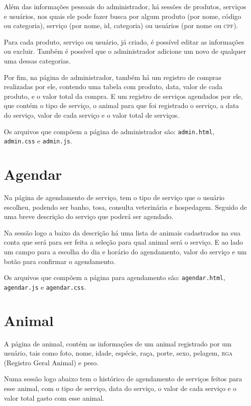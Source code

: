 Além das informações pessoais do administrador, há sessões de produtos,
serviços e usuários, nos quais ele pode fazer busca por algum produto (por nome,
código ou categoria), serviço (por nome, id, categoria) ou usuários (por nome ou
\textsc{cpf}).

Para cada produto, serviço ou usuário, já criado, é possível editar as informações
ou excluir. Também é possível que o administrador adicione um novo de qualquer uma
dessas categorias.

Por fim, na página de administrador, também há um registro de compras realizadas por
ele, contendo uma tabela com produto, data, valor de cada produto, e o valor total da
compra. E um registro de serviços agendados por ele, que contém o tipo de serviço, o
animal para que foi registrado o serviço, a data do serviço, valor de cada serviço e o
valor total de serviços.

Os arquivos que compõem a página de administrador são: \texttt{admin.html},
\texttt{admin.css} e \texttt{admin.js}.

\section{Agendar}
Na página de agendamento de serviço, tem o tipo de serviço que o usuário escolheu,
podendo ser banho, tosa, consulta veterinária e hospedagem. Seguido de uma breve descrição
do serviço que poderá ser agendado.

Na sessão logo a baixo da descrição há uma lista de animais cadastrados na sua conta
que será para ser feita a seleção para qual animal será o serviço. E ao lado um campo
para a escolha do dia e horário do agendamento, valor do serviço e um botão para confirmar
o agendamento.

Os arquivos que compõem a página para agendamento são: \texttt{agendar.html},\\
\texttt{agendar.js} e \texttt{agendar.css}.

\section{Animal}
A página de animal, contém as informações de um animal registrado por um usuário, tais como
foto, nome, idade, espécie, raça, porte, sexo, pelagem, \textsc{rga} (Registro Geral Animal)
e peso.

Numa sessão logo abaixo tem o histórico de agendamento de serviços feitos para esse animal,
com o tipo de serviço, data do serviço, o valor de cada serviço e o valor total gasto com
esse animal.

